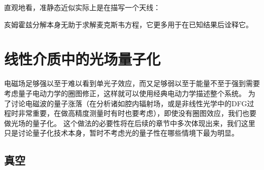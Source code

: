 直观地看，准静态近似实际上是在描写一个天线：

亥姆霍兹分解本身无助于求解麦克斯韦方程，它更多用于在已知结果后诠释它。

\section{线性介质中的光场量子化}

电磁场足够强以至于难以看到单光子效应，而又足够弱以至于能量不至于强到需要考虑量子电动力学的圈图修正，这样就可以使用经典电动力学描述整个系统。
为了讨论电磁波的量子涨落（在分析诸如腔内辐射场，或是非线性光学中的DFG过程时非常重要，在做高精度测量时有时也要考虑），即使没有圈图效应，我们也要做光场的量子化。
这个做法的必要性将在后续的章节中多次体现出来，我们这里只是讨论量子化技术本身，暂时不考虑光的量子性在哪些情境下最为明显。

\subsection{真空}\label{sec:quantization-in-vacuum}

